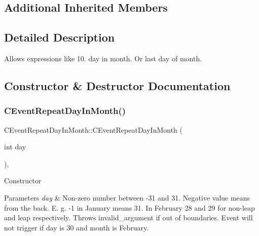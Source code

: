 \subsection*{Additional Inherited Members}


\subsection{Detailed Description}
Allows expressions like 10. day in month. Or last day of month. 

\subsection{Constructor \& Destructor Documentation}
\mbox{\label{class_c_event_repeat_day_in_month_a161460e3eeb9fa2a027d39004828a760}} 
\subsubsection{\texorpdfstring{C\+Event\+Repeat\+Day\+In\+Month()}{CEventRepeatDayInMonth()}}
{\footnotesize\ttfamily C\+Event\+Repeat\+Day\+In\+Month\+::\+C\+Event\+Repeat\+Day\+In\+Month (\begin{DoxyParamCaption}\item[{int}]{day }\end{DoxyParamCaption})\hspace{0.3cm}{\ttfamily [inline]}, {\ttfamily [explicit]}}

Constructor 
\begin{DoxyParams}{Parameters}
{\em day} & Non-\/zero number between -\/31 and 31. Negative value means from the back. E. g. -\/1 in January means 31. In February 28 and 29 for non-\/leap and leap respectively. Throws invalid\+\_\+argument if out of boundaries. Event will not trigger if day is 30 and month is February. \\
\hline
\end{DoxyParams}
\mbox{\label{class_c_event_repeat_day_in_month_a37483901cea40744356c63cc491f759a}} 
